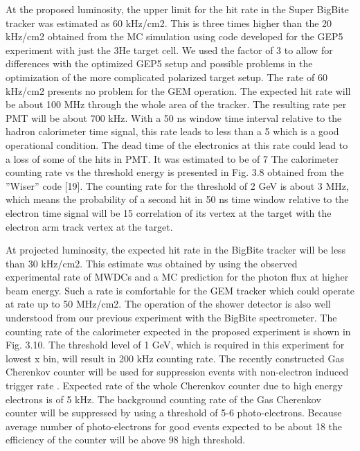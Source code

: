 \documentclass{article}
\begin{document}
At the proposed luminosity, the upper limit for the hit rate in the Super BigBite tracker
was estimated as 60 kHz/cm2. This is three times higher than the 20 kHz/cm2 obtained
from the MC simulation using code developed for the GEP5 experiment with just the 3He
target cell. We used the factor of 3 to allow for differences with the optimized GEP5 setup
and possible problems in the optimization of the more complicated polarized target setup.
The rate of 60 kHz/cm2 presents no problem for the GEM operation. The expected hit rate
will be about 100 MHz through the whole area of the tracker.
The resulting
rate per PMT will be about 700 kHz. With a 50 ns window time interval relative to the
hadron calorimeter time signal, this rate leads to less than a 5%
which is a good operational condition. The dead time of the electronics at this rate could
lead to a loss of some of the hits in PMT. It was estimated to be of 7%
The calorimeter counting rate vs the threshold energy is presented in Fig. 3.8 obtained
from the ”Wiser” code [19]. The counting rate for the threshold of 2 GeV is about 3 MHz,
which means the probability of a second hit in 50 ns time window relative to the electron
time signal will be 15%
correlation of its vertex at the target with the electron arm track vertex at the target.


At projected luminosity, the expected hit rate in the BigBite tracker will be less than
30 kHz/cm2. This estimate was obtained by using the observed experimental rate of MWDCs
and a MC prediction for the photon flux at higher beam energy. Such a rate is comfortable
for the GEM tracker which could operate at rate up to 50 MHz/cm2.
The operation of the shower detector is also well understood from our previous experiment
with the BigBite spectrometer. The counting rate of the calorimeter expected in the proposed
experiment is shown in Fig. 3.10. The threshold level of 1 GeV, which is required in this
experiment for lowest x bin, will result in 200 kHz counting rate. The recently constructed
Gas Cherenkov counter will be used for suppression events with non-electron induced trigger
rate . Expected rate of the whole Cherenkov counter due to high energy electrons is of 5 kHz.
The background counting rate of the Gas Cherenkov counter will be suppressed by using a
threshold of 5-6 photo-electrons. Because average number of photo-electrons for good events
expected to be about 18 the efficiency of the counter will be above 98%
high threshold.
\end{document}
